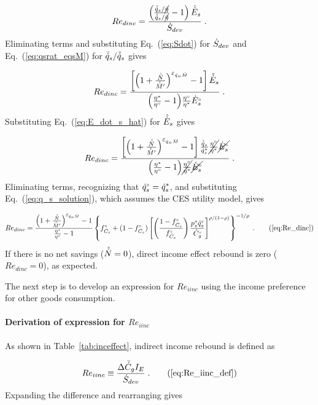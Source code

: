 \begin{equation}
  Re_{dinc} = \frac{\left( \frac{\bar{\dot{q}}_s / \cancel{\bar{\eta}}}{\hat{\dot{q}}_s / \cancel{\hat{\eta}}} - 1  \right) \hat{\dot{E}}_s}
              {\dot{S}_{dev}} \; .
\end{equation}
%
Eliminating terms and substituting Eq.~(\ref{eq:Sdot}) for $\dot{S}_{dev}$ and
Eq.~(\ref{eq:qsrat_eqsM}) for $\bar{\dot{q}}_s / \hat{\dot{q}}_s$ gives

\begin{equation}
  Re_{dinc} = \frac{\left[ \left( 1 + \frac{\hat{\dot{N}}}{\hat{\dot{M}}^\prime} \right) ^{\varepsilon_{\dot{q}_s\!,\dot{M}}} - 1  \right] \hat{\dot{E}}_s}
              {\left( \frac{{\eta}^*}{{}{\eta}^{\scriptscriptstyle \circ}} - 1 \right)\! \frac{{}{\eta}^{\scriptscriptstyle \circ}}{{\eta}^*} {}{\dot{E}}^{\scriptscriptstyle \circ}_s} \; .
\end{equation}
%
Substituting Eq.~(\ref{eq:E_dot_s_hat}) for $\hat{\dot{E}}_s$ gives

\begin{equation}
  Re_{dinc} = \frac{\left[ \left( 1 + \frac{\hat{\dot{N}}}{\hat{\dot{M}}^\prime} \right) ^{\varepsilon_{\dot{q}_s\!,\dot{M}}} - 1  \right]
                  \frac{\hat{\dot{q}}_s}{{\dot{q}}^*_s}
                \cancel{\frac{{}{\eta}^{\scriptscriptstyle \circ}}{{\eta}^*}}
                \cancel{{}{\dot{E}}^{\scriptscriptstyle \circ}_s}}
              {\left( \frac{{\eta}^*}{{}{\eta}^{\scriptscriptstyle \circ}} - 1 \right)\!
                  \cancel{\frac{{}{\eta}^{\scriptscriptstyle \circ}}{{\eta}^*}} \cancel{{}{\dot{E}}^{\scriptscriptstyle \circ}_s}} \; .
\end{equation}
%
Eliminating terms, recognizing that
${}{\dot{q}}^{\scriptscriptstyle \circ}_s = {\dot{q}}^*_s$, and substituting Eq.~(\ref{eq:q_s_solution}),
which assumes the CES utility model,
gives

\begin{equation}
  Re_{dinc} = \Redinceqnexact{} \; . \tag{\ref{eq:Re_dinc}}
\end{equation}
%
If there is no net savings ($\hat{\dot{N}} = 0$),
direct income effect rebound is zero ($Re_{dinc} = 0$), as expected.

The next step is to develop an expression for $Re_{iinc}$
using the income preference for other goods consumption.


\paragraph{Derivation of expression for $Re_{iinc}$}
\label{sec:Re_iinc}

As shown in Table~\ref{tab:inceffect}, indirect income rebound is defined as

\begin{equation}
  Re_{iinc} \equiv \frac{\Delta \rainc{C}_g I_E}{\Sdot} \; . \tag{\ref{eq:Re_iinc_def}}
\end{equation}
%
Expanding the difference and rearranging gives

